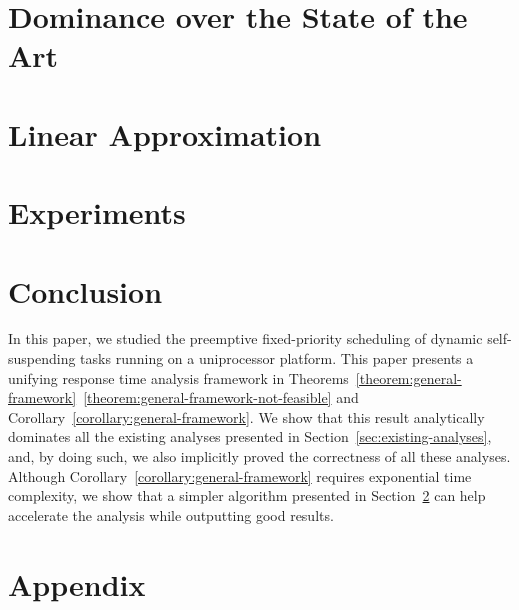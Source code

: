 \documentclass[twoside,titlepage,fleqn,
                pointlessnumbers,headinclude,BCOR5mm,
                ]{scrreprt}
\begin{document}
\chapter{Dominance over the State of the Art}
\label{sec:dominance}


\chapter{Linear Approximation}
\label{sec:linear-approximation}










\chapter{Experiments}
\label{sec:experiments}




\chapter{Conclusion}
\label{sec:conclusion}


In this paper, we studied the preemptive fixed-priority scheduling of
dynamic self-suspending tasks running on a uniprocessor platform. This
paper presents a unifying response time analysis framework in
Theorems~\ref{theorem:general-framework}~\ref{theorem:general-framework-not-feasible} and
Corollary~\ref{corollary:general-framework}. We show that this result
analytically dominates all the existing analyses presented in
Section~\ref{sec:existing-analyses}, and, by doing such, we also implicitly
proved the correctness of all these analyses. Although
Corollary~\ref{corollary:general-framework} requires exponential time
complexity, we show that a simpler algorithm presented in Section~\ref{sec:linear-approximation} can help accelerate the analysis while outputting good results.



{}

\chapter{Appendix}





%
\end{document}
